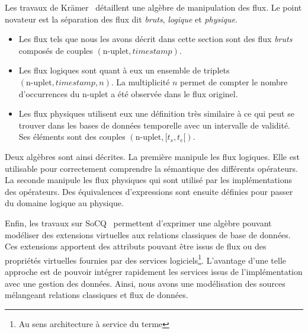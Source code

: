 Les travaux de Krämer~\cite{Kramer:semantics} détaillent une algèbre de manipulation des flux. Le point novateur est la séparation des flux dit \textit{bruts}, \textit{logique} et \textit{physique}. 
\begin{itemize}
	\item Les flux tels que nous les avons décrit dans cette section sont des flux \textit{bruts} composés de couples $(\textrm{n-uplet},\textit{timestamp})$.
	\item Les flux logiques sont quant à eux un ensemble de triplets $(\textrm{n-uplet}, \textit{timestamp}, n)$. La multiplicité $n$ permet de compter le nombre d'occurrences du n-uplet a été observée dans le flux originel.
	\item Les flux physiques utilisent eux une définition très similaire à ce qui peut se trouver dans les bases de données temporelle avec un intervalle de validité. Ses éléments sont des couples $(\textrm{n-uplet},[t_s, t_e[)$.
\end{itemize} 
Deux algèbres sont ainsi décrites. La première manipule les flux logiques. Elle est utilisable pour correctement comprendre la sémantique des différents opérateurs. La seconde manipule les flux physiques qui sont utilisé par les implémentations des opérateurs. Des équivalences d'expressions sont ensuite définies pour passer du domaine logique au physique.

Enfin, les travaux sur SoCQ~\cite{Gripay:algebra} permettent d'exprimer une algèbre pouvant modéliser des extensions virtuelles aux relations classiques de base de données. Ces extensions apportent des attributs pouvant être issus de flux ou des propriétés virtuelles fournies par des services logiciels\footnote{Au sens architecture à service du terme}. L'avantage d'une telle approche est de pouvoir intégrer rapidement les services issus de l'implémentation avec une gestion des données. Ainsi, nous avons une modélisation des sources mélangeant relations classiques et flux de données.

